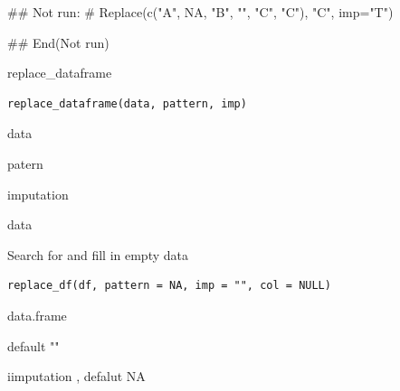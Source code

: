 \documentclass[a4paper]{book}
\begin{document}
%
\begin{Examples}
\begin{ExampleCode}

\#\# Not run: 
# Replace(c("A", NA, "B", "", "C", "C"), "C", imp="T")

## End(Not run)

\end{ExampleCode}
\end{Examples}
%
\begin{Description}
replace\_dataframe
\end{Description}
%
\begin{Usage}
\begin{verbatim}
replace_dataframe(data, pattern, imp)
\end{verbatim}
\end{Usage}
%
\begin{Arguments}
\begin{ldescription}
\item[\code{data}] data

\item[\code{pattern}] patern

\item[\code{imp}] imputation
\end{ldescription}
\end{Arguments}
%
\begin{Value}
data
\end{Value}
%
\begin{Description}
Search for and fill in empty data
\end{Description}
%
\begin{Usage}
\begin{verbatim}
replace_df(df, pattern = NA, imp = "", col = NULL)
\end{verbatim}
\end{Usage}
%
\begin{Arguments}
\begin{ldescription}
\item[\code{df}] data.frame

\item[\code{pattern}] default ""

\item[\code{imp}] iimputation , defalut NA
\end{ldescription}
\end{Arguments}
\end{document}
